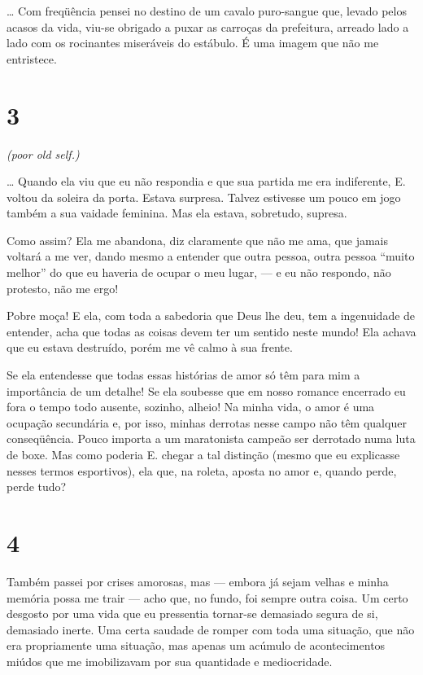\ldots{} Com freqüência pensei no destino de um cavalo puro-sangue que,
levado pelos acasos da vida, viu-se obrigado a puxar as carroças da
prefeitura, arreado lado a lado com os rocinantes miseráveis do
estábulo. É uma imagem que não me entristece.

\section{3}


\emph{(poor old self.)}

\ldots{} Quando ela viu que eu não respondia e que sua partida me era
indiferente, E. voltou da soleira da porta. Estava surpresa. Talvez
estivesse um pouco em jogo também a sua vaidade feminina. Mas ela
estava, sobretudo, supresa.

Como assim? Ela me abandona, diz claramente que não me ama, que jamais
voltará a me ver, dando mesmo a entender que outra pessoa, outra pessoa
``muito melhor'' do que eu haveria de ocupar o meu lugar, --- e eu não
respondo, não protesto, não me ergo!

Pobre moça! E ela, com toda a sabedoria que Deus lhe deu, tem a
ingenuidade de entender, acha que todas as coisas devem ter um sentido
neste mundo! Ela achava que eu estava destruído, porém me vê calmo à sua
frente.

Se ela entendesse que todas essas histórias de amor só têm para mim a
importância de um detalhe! Se ela soubesse que em nosso romance
encerrado eu fora o tempo todo ausente, sozinho, alheio! Na minha vida,
o amor é uma ocupação secundária e, por isso, minhas derrotas nesse
campo não têm qualquer conseqüência. Pouco importa a um maratonista
campeão ser derrotado numa luta de boxe. Mas como poderia E. chegar a
tal distinção (mesmo que eu explicasse nesses termos esportivos), ela
que, na roleta, aposta no amor e, quando perde, perde tudo?

\section{4}

Também passei por crises amorosas, mas --- embora já sejam velhas e minha
memória possa me trair --- acho que, no fundo, foi sempre outra coisa. Um
certo desgosto por uma vida que eu pressentia tornar-se demasiado segura
de si, demasiado inerte. Uma certa saudade de romper com toda uma
situação, que não era propriamente uma situação, mas apenas um acúmulo
de acontecimentos miúdos que me imobilizavam por sua quantidade e
mediocridade.

